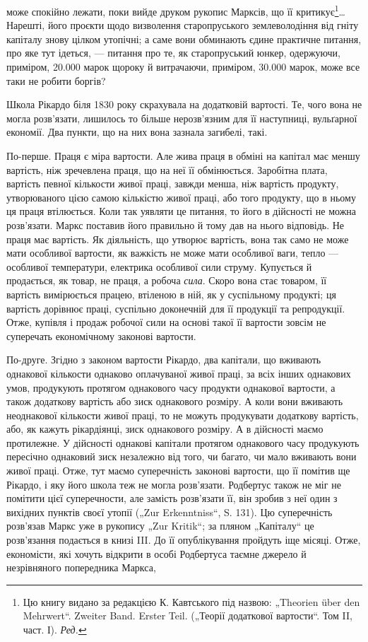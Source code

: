 \parcont{}  %
може спокійно лежати, поки вийде друком рукопис Марксів, що її критикує\footnote*{
Цю книгу видано за редакцією К. Кавтського під назвою: „Theorien über den Mehrwert“. Zweiter
Band. Erster Teil. („Теорії додаткової вартости“. Том II, част. І). \emph{Ред.}
}\dots{} Нарешті, його проєкти
щодо визволення старопруського землеволодіння від гніту капіталу знову цілком утопічні; а саме вони
обминають єдине практичне питання, про яке тут ідеться, — питання про те, як старопруський юнкер,
одержуючи, приміром, 20.000 марок щороку й витрачаючи, приміром, 30.000 марок, може все таки не
робити боргів?

Школа Рікардо біля 1830 року скрахувала на додатковій вартості. Те, чого вона не могла розв’язати,
лишилось то більше нерозв’язним для її наступниці, вульґарної економії. Два пункти, що на них вона
зазнала загибелі, такі.

По-перше. Праця є міра вартости. Але жива праця в обміні на капітал має меншу вартість, ніж
зречевлена праця, що на неї її обмінюється. Заробітна плата, вартість певної кількости живої праці,
завжди менша, ніж вартість продукту, утворюваного цією самою кількістю живої праці, або того
продукту, що в ньому ця праця втілюється. Коли
так уявляти це питання, то його в дійсності не можна розв’язати. Маркс поставив його правильно й
тому дав на нього відповідь. Не праця має вартість. Як діяльність, що утворює вартість, вона так
само не може мати особливої вартости, як важкість не може мати особливої ваги, тепло — особливої
температури, електрика особливої сили струму. Купується й продається, як товар, не праця, а робоча
\emph{сила}. Скоро вона стає товаром, її вартість вимірюється працею, втіленою в ній, як у суспільному
продукті; ця вартість дорівнює праці, суспільно доконечній для її продукції та репродукції. Отже,
купівля і продаж робочої сили на основі такої її вартости зовсім не суперечать економічному законові
вартости.

По-друге. Згідно з законом вартости Рікардо, два капітали, що вживають однакової кількости однаково
оплачуваної живої праці, за всіх інших однакових умов, продукують протягом однакового часу продукти
однакової вартости, а також додаткову вартість або зиск однакового розміру. А коли вони вживають
неоднакової кількости живої праці, то не можуть продукувати додаткову вартість, або, як кажуть
рікардіянці, зиск однакового розміру. А в дійсності маємо протилежне. У дійсності однакові
капітали протягом однакового часу продукують пересічно однаковий зиск незалежно від того, чи багато,
чи мало вживають вони живої праці. Отже, тут маємо суперечність законові вартости, що її помітив ще
Рікардо, і яку його школа теж не могла розв’язати. Родбертус також не міг не помітити цієї
суперечности, але замість розв’язати її, він зробив з неї один з вихідних пунктів своєї утопії („Zur
Erkenntniss“, S. 131). Цю суперечність розв’язав Маркс уже в рукопису „Zur Kritik“; за пляном
„Капіталу“ це розв’язання подається в книзі III. До її опублікування пройдуть іще місяці. Отже,
економісти, які хочуть відкрити в особі Родбертуса таємне джерело й незрівняного попередника Маркса,
\parbreak{}  %
